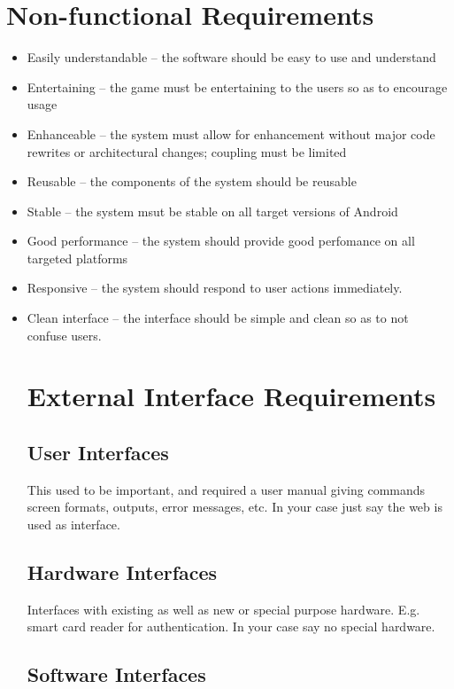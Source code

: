 \documentclass[a4wide]{article}
\begin{document}
\section{Non-functional Requirements}
\begin{itemize}
\item Easily understandable -- the software should be easy to use and understand
\item Entertaining -- the game must be entertaining to the users so as to encourage usage
\item Enhanceable -- the system must allow for enhancement without major code rewrites or architectural changes; coupling must be limited
\item Reusable -- the components of the system should be reusable
\item Stable -- the system msut be stable on all target versions of Android
\item Good performance -- the system should provide good perfomance on all targeted platforms
\item Responsive -- the system should respond to user actions immediately.
\item Clean interface -- the interface should be simple and clean so as to not confuse users.


\section{External Interface Requirements}

\subsection{User Interfaces}

This used to be important, and required a user manual giving commands
screen formats, outputs, error messages, etc.
In your case just say the web is used as interface.

\subsection{Hardware Interfaces}

Interfaces with existing as well as new or special purpose hardware.
E.g. smart card reader for authentication.
In your case say no special hardware.

\subsection{Software Interfaces}


\end{itemize}
\end{document}
